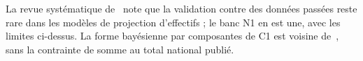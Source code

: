 La revue systématique de~\cite{b-lee2024hrh} note que la validation contre des données passées reste rare
dans les modèles de projection d'effectifs ; le banc N1 en est une, avec les limites ci-dessus. La forme
bayésienne par composantes de C1 est voisine de~\cite{b-alexander2021bayesian}, sans la contrainte de somme
au total national publié.
\endgroup
